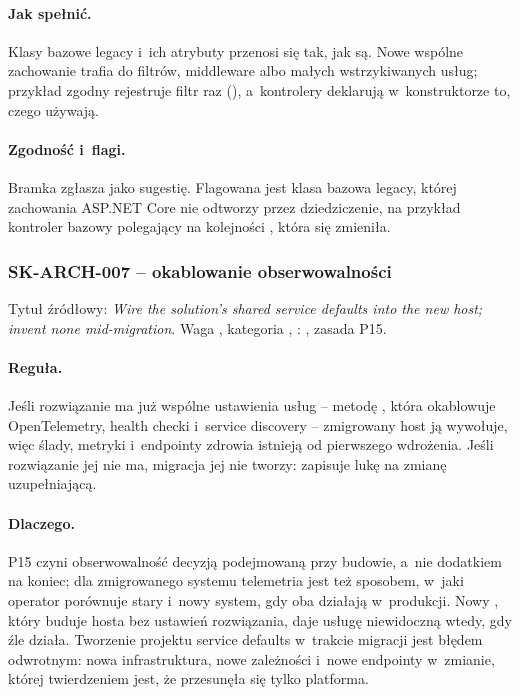 \paragraph{Jak spełnić.} Klasy bazowe legacy i~ich atrybuty przenosi się tak, jak są. Nowe
wspólne zachowanie trafia do filtrów, middleware albo małych wstrzykiwanych usług; przykład
zgodny rejestruje filtr raz
(), a~kontrolery deklarują w~konstruktorze
to, czego używają.

\paragraph{Zgodność i~flagi.} Bramka zgłasza  jako
sugestię. Flagowana jest klasa bazowa legacy, której zachowania ASP.NET Core nie odtworzy
przez dziedziczenie, na przykład kontroler bazowy polegający na kolejności
, która się zmieniła.


\subsubsection{SK-ARCH-007 -- okablowanie obserwowalności}\label{sec:standardy-sk-arch-007}

Tytuł źródłowy: \emph{Wire the solution's shared service defaults into the new host; invent
none mid-migration}. Waga , kategoria ,
: , zasada P15.

\paragraph{Reguła.} Jeśli rozwiązanie ma już wspólne ustawienia usług -- metodę
, która okablowuje OpenTelemetry, health checki i~service
discovery -- zmigrowany host ją wywołuje, więc ślady, metryki i~endpointy zdrowia istnieją od
pierwszego wdrożenia. Jeśli rozwiązanie jej nie ma, migracja jej nie tworzy: zapisuje lukę
na zmianę uzupełniającą.

\paragraph{Dlaczego.} P15 czyni obserwowalność decyzją podejmowaną przy budowie, a~nie
dodatkiem na koniec; dla zmigrowanego systemu telemetria jest też sposobem, w~jaki operator
porównuje stary i~nowy system, gdy oba działają w~produkcji. Nowy ,
który buduje hosta bez ustawień rozwiązania, daje usługę niewidoczną wtedy, gdy źle działa.
Tworzenie projektu service defaults w~trakcie migracji jest błędem odwrotnym: nowa
infrastruktura, nowe zależności i~nowe endpointy w~zmianie, której twierdzeniem jest, że
przesunęła się tylko platforma.

